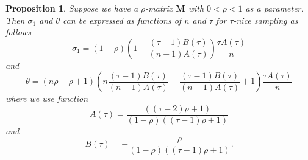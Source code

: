 \documentclass[11pt]{article}
\newtheorem{proposition}{Proposition}
\begin{document}
	\begin{proposition}
		Suppose we have a $\rho$-matrix $\mathbf{M}$ with $0<\rho<1$ as a parameter. Then $\sigma_1$ and $ \theta$ can be expressed as functions of $n$ and $\tau$ for $\tau$-nice sampling as follows 
		\begin{equation}
			\sigma_1=(1-\rho)\left(1-\frac{(\tau-1)B(\tau)}{(n-1)A(\tau)}\right)\frac{\tau A(\tau)}{n}
		\end{equation}
		and 
		\begin{equation}
			 \theta=(n\rho-\rho+1)\left(n\frac{(\tau-1)B(\tau)}{(n-1)A(\tau)}-\frac{(\tau-1)B(\tau)}{(n-1)A(\tau)}+1\right)\frac{\tau A(\tau)}{n}
		\end{equation}
		where we use function
		\begin{equation}
			A(\tau)=\frac{((\tau-2)\rho+1)}{(1-\rho)((\tau-1)\rho+1)}
		\end{equation}
		and 
		\begin{equation}
			B(\tau)=-\frac{\rho}{(1-\rho)((\tau-1)\rho+1)}.
		\end{equation}
	\end{proposition}
\end{document}
